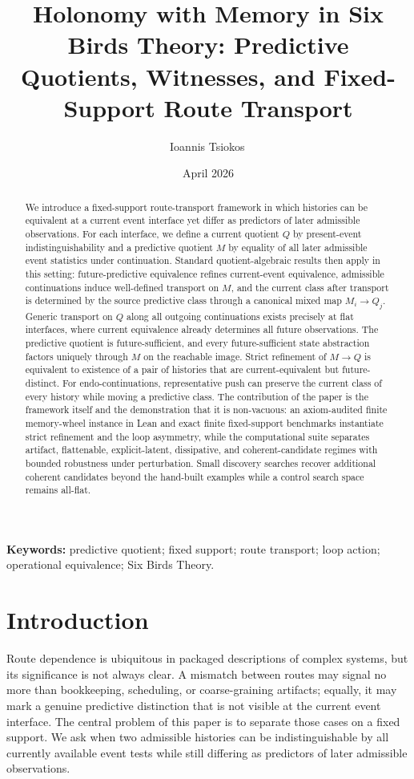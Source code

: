 \documentclass[11pt]{article}
\title{Holonomy with Memory in Six Birds Theory: Predictive Quotients, Witnesses, and Fixed-Support Route Transport}
\author{Ioannis Tsiokos\,\orcidlink{0009-0009-7659-5964}}
\date{April 2026}
\newcommand{\CurrentQ}{Q}
\newcommand{\PredictiveQ}{M}
\theoremstyle{definition}
\begin{document}
\maketitle
\thispagestyle{firstpage}

\begin{abstract}
We introduce a fixed-support route-transport framework in which histories can be equivalent at a current event interface yet differ as predictors of later admissible observations. For each interface, we define a current quotient $\CurrentQ$ by present-event indistinguishability and a predictive quotient $\PredictiveQ$ by equality of all later admissible event statistics under continuation. Standard quotient-algebraic results then apply in this setting: future-predictive equivalence refines current-event equivalence, admissible continuations induce well-defined transport on $\PredictiveQ$, and the current class after transport is determined by the source predictive class through a canonical mixed map $\PredictiveQ_i\to\CurrentQ_j$. Generic transport on $\CurrentQ$ along all outgoing continuations exists precisely at flat interfaces, where current equivalence already determines all future observations. The predictive quotient is future-sufficient, and every future-sufficient state abstraction factors uniquely through $\PredictiveQ$ on the reachable image. Strict refinement of $\PredictiveQ \to \CurrentQ$ is equivalent to existence of a pair of histories that are current-equivalent but future-distinct. For endo-continuations, representative push can preserve the current class of every history while moving a predictive class. The contribution of the paper is the framework itself and the demonstration that it is non-vacuous: an axiom-audited finite memory-wheel instance in Lean and exact finite fixed-support benchmarks instantiate strict refinement and the loop asymmetry, while the computational suite separates artifact, flattenable, explicit-latent, dissipative, and coherent-candidate regimes with bounded robustness under perturbation. Small discovery searches recover additional coherent candidates beyond the hand-built examples while a control search space remains all-flat.
\end{abstract}

\medskip
\noindent\textbf{Keywords:} predictive quotient; fixed support; route transport; loop action; operational equivalence; Six Birds Theory.

\section{Introduction}\label{sec:introduction}
Route dependence is ubiquitous in packaged descriptions of complex systems, but its significance is not always clear. A mismatch between routes may signal no more than bookkeeping, scheduling, or coarse-graining artifacts; equally, it may mark a genuine predictive distinction that is not visible at the current event interface. The central problem of this paper is to separate those cases on a fixed support. We ask when two admissible histories can be indistinguishable by all currently available event tests while still differing as predictors of later admissible observations.
\end{document}
